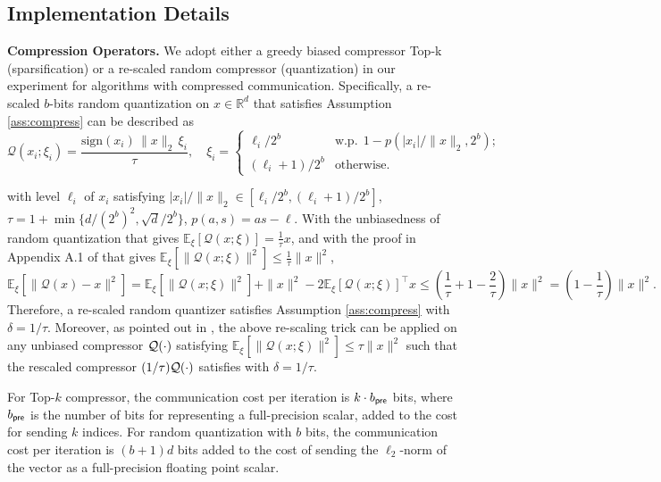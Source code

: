 \documentclass[10pt]{article} %
\newcommand{\revision}{}
\theoremstyle{plain}
\theoremstyle{definition}
\theoremstyle{remark}
\newcommand{\redtmp}{}
\begin{document}
{\redtmp \subsection{Implementation Details}
\textbf{Compression Operators.} \label{app:subsec:rescale}
We adopt either a greedy biased compressor Top-k (sparsification) or a {\revision re-scaled} random compressor (quantization) \citep{alistarh2017qsgd} in our experiment for algorithms with compressed communication. Specifically, a {\revision re-scaled} $b$-bits random quantization \citep{koloskova2019decentralized} on $x\in\mathbb{R}^d$ {\revision that satisfies Assumption \ref{ass:compress}} can be described as
\begin{equation}\mathcal{Q}(x_i; \xi_i) = \frac{\text{sign}(x_i) \, \| x \|_2 \, \xi_i}{{\revision \tau}}, \quad
    \xi_i = 
    \begin{cases}
        \ell_i / 2^b &\text{w.p.}~\ 1- p(|x_i|/\|x\|_2, 2^b); \\
        (\ell_i +1)/ 2^b &\text{otherwise}.
    \end{cases}
\end{equation}

with level $\ell_i$ of $x_i$ satisfying $|x_i|/\|x\|_2 \in [\ell_i / 2^b, (\ell_i + 1)/ 2^b]$, {\revision $\tau = 1 + \min\{ d / (2^b)^2, \sqrt{d} / 2^b \}$}, $p(a,s) = as - \ell$. 
{\revision With the unbiasedness of random quantization \citep{alistarh2017qsgd} that gives $\mathbb{E}_\xi[\mathcal{Q}(x;\xi)] = \frac{1}{\tau} x$, and with the proof in Appendix A.1 of \citep{alistarh2017qsgd} that gives $\mathbb{E}_\xi[\| \mathcal{Q}(x; \xi) \|^2] \leq \frac{1}{\tau} \|x\|^2$,
\begin{equation}
\mathbb{E}_\xi[\| \mathcal{Q}(x) - x \|^2] = \mathbb{E}_\xi[\|\mathcal{Q}(x;\xi) \|^2] + \|x \|^2 - 2 \mathbb{E}_\xi[\mathcal{Q}(x;\xi)]^\top x \leq (\frac{1}{\tau} +1-\frac{2}{\tau}) \|x\|^2 = (1-\frac{1}{\tau})\|x\|^2. 
\end{equation}
Therefore, a re-scaled random quantizer satisfies Assumption \ref{ass:compress} with $\delta = 1/ \tau$.
Moreover, as pointed out in \citep[Section 3.5]{koloskova2019decentralized}, the above re-scaling trick can be applied on any unbiased compressor ${\cal Q}(\cdot)$ satisfying $\mathbb{E}_\xi[\| \mathcal{Q}(x; \xi) \|^2] \leq \tau \|x\|^2$ such that the rescaled compressor $(1/\tau){\cal Q}(\cdot)$ satisfies  with $\delta = 1/\tau$.
}

For Top-$k$ compressor, the communication cost per iteration is $k\cdot b_{\sf pre}$ bits, where $b_{\sf pre}$ is the number of bits for representing a full-precision scalar, added to the cost for sending $k$ indices. For random quantization with $b$ bits, the communication cost per iteration is $(b+1)d$ bits added to the cost of sending the $\ell_2$-norm of the vector as a full-precision floating point scalar.

}
\end{document}

